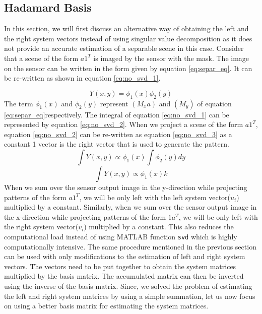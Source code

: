 \subsection{Hadamard Basis}
In this section, we will first discuss an alternative way of obtaining the left and the right system vectors instead of using singular value decomposition as it does not provide an accurate estimation of a separable scene in this case. Consider that a scene of the form $a1^T$ is imaged by the sensor with the mask. The image on the sensor can be written in the form given by equation \ref{eq:separ_eq}. It can be re-written as shown in equation \ref{eq:no_svd_1}.

\begin{equation}
Y(x,y) = \phi_1(x)\phi_2(y)
\label{eq:no_svd_1}
\end{equation}
The term $\phi_1(x)$ and $\phi_2(y)$ represent $(M_xa)$ and $(M_y)$ of equation \ref{eq:separ_eq}respectively. The integral of equation \ref{eq:no_svd_1} can be represented by equation \ref{eq:no_svd_2}. When we project a scene of the form $a1^T$, equation \ref{eq:no_svd_2} can be re-written as equation \ref{eq:no_svd_3} as a constant 1 vector is the right vector that is used to generate the pattern.
\begin{equation}
\int Y(x,y) \propto \phi_1(x)\int \phi_2(y)dy
\label{eq:no_svd_2}
\end{equation}
\begin{equation}
\int Y(x,y) \propto \phi_1(x) k
\label{eq:no_svd_3}
\end{equation}
When we sum over the sensor output image in the y-direction while projecting  patterns of the  form $a1^T$, we will be only left with the left system vector($u_i$) multiplied by a constant. Similarly, when we sum over the sensor output image in the x-direction while projecting  patterns of the  form $1a^T$, we will be only left with the right system vector($v_i$) multiplied by a constant. This also reduces the computational load instead of using MATLAB function \texttt{svd} which is highly computationally intensive. The same procedure mentioned in the previous section can be used with only modifications to the estimation of left and right system vectors. The vectors need to be put together to obtain the system matrices multiplied by the basis matrix. The accumulated matrix can then be inverted using the inverse of the basis matrix. Since, we solved the problem of estimating the left and right system matrices by using a simple summation, let us now focus on using a better basis matrix for estimating the system matrices. 

